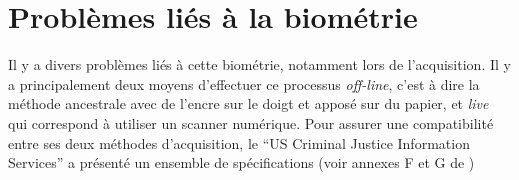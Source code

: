 \section{Problèmes liés à la biométrie}

Il y a divers problèmes liés à cette biométrie, notamment lors de
l'acquisition. Il y a principalement deux moyens d'effectuer ce
processus \emph{off-line}, c'est à dire la méthode ancestrale avec de
l'encre sur le doigt et apposé sur du papier, et \emph{live} qui
correspond à utiliser un scanner numérique. Pour assurer une
compatibilité entre ses deux méthodes d'acquisition, le ``US Criminal
Justice Information Services'' a présenté un ensemble de
spécifications (voir annexes F et G de \cite{nla.cat-vn4185009})



